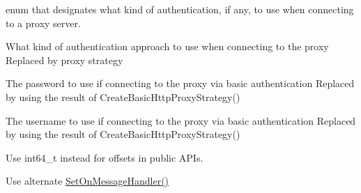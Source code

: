 
\begin{DoxyRefList}
\item[Member \mbox{\hyperlink{namespace_aws_1_1_crt_1_1_http_af3cef7161b636a6450f5cb4a50021979}{Aws\+::Crt\+::Http\+::Aws\+Http\+Proxy\+Authentication\+Type}} ]\label{deprecated__deprecated000001}%
%
enum that designates what kind of authentication, if any, to use when connecting to a proxy server. 
\item[Member \mbox{\hyperlink{class_aws_1_1_crt_1_1_http_1_1_http_client_connection_proxy_options_acebea08ca57582414378e350a7ff465d}{Aws\+::Crt\+::Http\+::Http\+Client\+Connection\+Proxy\+Options\+::Auth\+Type}} ]\label{deprecated__deprecated000002}%
%
What kind of authentication approach to use when connecting to the proxy Replaced by proxy strategy 
\item[Member \mbox{\hyperlink{class_aws_1_1_crt_1_1_http_1_1_http_client_connection_proxy_options_a7d985f6c95cc9d5f36e35f5260ca0263}{Aws\+::Crt\+::Http\+::Http\+Client\+Connection\+Proxy\+Options\+::Basic\+Auth\+Password}} ]\label{deprecated__deprecated000004}%
%
The password to use if connecting to the proxy via basic authentication Replaced by using the result of Create\+Basic\+Http\+Proxy\+Strategy()  
\item[Member \mbox{\hyperlink{class_aws_1_1_crt_1_1_http_1_1_http_client_connection_proxy_options_ad22e9b2475ecf638dda7198651fb9c59}{Aws\+::Crt\+::Http\+::Http\+Client\+Connection\+Proxy\+Options\+::Basic\+Auth\+Username}} ]\label{deprecated__deprecated000003}%
%
The username to use if connecting to the proxy via basic authentication Replaced by using the result of Create\+Basic\+Http\+Proxy\+Strategy()  
\item[Member \mbox{\hyperlink{namespace_aws_1_1_crt_1_1_io_af399239ad685d64f2f5b88a0906a232c}{Aws\+::Crt\+::Io\+::Offset\+Type}} ]\label{deprecated__deprecated000005}%
%
Use int64\+\_\+t instead for offsets in public APIs.  
\item[Member \mbox{\hyperlink{class_aws_1_1_crt_1_1_mqtt_1_1_mqtt_connection_a5d6f5a1a9469a3a5f1d2c9c3f0892aa1}{Aws\+::Crt\+::Mqtt\+::Mqtt\+Connection\+::Set\+On\+Message\+Handler}} (On\+Publish\+Received\+Handler \&\&on\+Publish) noexcept]\label{deprecated__deprecated000010}%
%
Use alternate \mbox{\hyperlink{class_aws_1_1_crt_1_1_mqtt_1_1_mqtt_connection_adaab4c2cf826b7e6a6e89a9854cbc527}{Set\+On\+Message\+Handler()}}  

\end{DoxyRefList}
